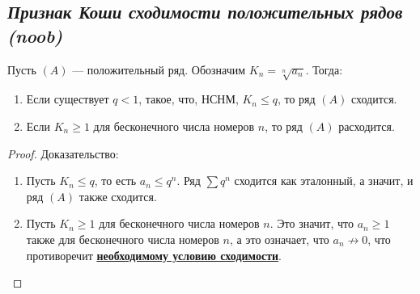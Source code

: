 \subsection{\itshape Признак Коши сходимости положительных рядов (noob)} \hypertarget{Коши-нуб}{}

\begin{theorem}
	Пусть \((A)\) --- положительный ряд. Обозначим \(K_n = \sqrt[n]{a_n}\). Тогда:
	\begin{enumerate}
		\item Если существует \(q < 1\), такое, что, НСНМ, \(K_n \leqslant q\), то ряд \((A)\) сходится.
		\item Если \(K_n \geqslant 1\) для бесконечного числа номеров \(n\), то ряд \((A)\) расходится.
	\end{enumerate}
\end{theorem}
\begin{proof}
	Доказательство:
	\begin{enumerate}
		\item Пусть  \(K_n \leqslant q\), то есть \(a_n \leqslant q^n\). Ряд \(\sum q^n\) сходится как эталонный, а значит, и ряд \((A)\) также сходится.
		\item Пусть \(K_n \geqslant 1\) для бесконечного числа номеров \(n\). Это значит, что \(a_n \geqslant 1\) также для бесконечного числа номеров \(n\), а это означает, что \(a_n \not\to 0\), что противоречит \hyperlink{необходимое условие сходимости}{\bfseries необходимому условию сходимости}.
	\end{enumerate}
\end{proof}